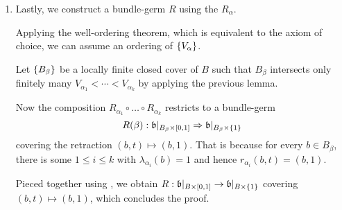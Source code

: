 \begin{scope}
\begin{myproof}
\begin{enumerate}
            \item
            Lastly, we construct a bundle-germ $R$ using the $R_\alpha$.

            Applying the well-ordering theorem,
            which is equivalent to the axiom of choice, we can assume an ordering of $\{V_\alpha\}$.

            Let $\{B_\beta\}$ be a locally finite closed cover of $B$
            such that $B_\beta$ intersects only finitely many $V_{\alpha_1} < \cdots < V_{\alpha_k}$
            by applying the previous lemma.

            Now the composition $R_{\alpha_1} \circ \ldots \circ R_{\alpha_k}$ restricts to a bundle-germ 
            \[ \germdef{R(\beta)}{\bb[\cyl{B_\beta}]}{\bb[\cylup{B_\beta}]} \]
            covering the retraction $(b, t) \mapsto (b, 1)$.
            That is because for every $b \in B_\beta$,
            there is some $1 \le i \le k$ with
            $\lambda_{\alpha_i}(b) = 1$ and hence $r_{\alpha_i}(b, t) = (b, 1)$.
            
            Pieced together using ,
            we obtain $R: \bb[\cyl{B}] \to \bb[\cylup{B}]$
            covering $(b, t) \mapsto (b, 1)$, which concludes the proof.
        \end{enumerate}    
    \end{myproof}
\end{scope}